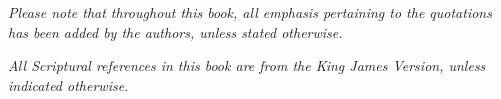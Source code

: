 \thispagestyle{empty}

\vspace*{1cm}

\begin{center}
    \textit{Please note that throughout this book, all emphasis pertaining to the quotations has been added by the authors, unless stated otherwise.}
    
    \textit{All Scriptural references in this book are from the King James Version, unless indicated otherwise.}
\end{center}
